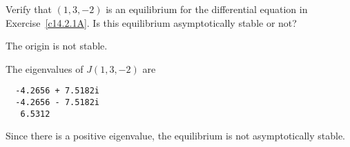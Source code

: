 \documentclass{ximera}
\begin{document}
\begin{exercise} \label{c14.2.1C}
Verify that $(1,3,-2)$ is an equilibrium for the differential equation in 
Exercise~\ref{c14.2.1A}.  Is this equilibrium asymptotically stable or not?

\begin{solution}
\ans The origin is not stable.

\soln The eigenvalues of $J(1,3,-2)$ are
\begin{verbatim}
  -4.2656 + 7.5182i
  -4.2656 - 7.5182i
   6.5312          
\end{verbatim}
Since there is a positive eigenvalue, the equilibrium is not 
asymptotically stable.


\end{solution}
\end{exercise}
\end{document}
